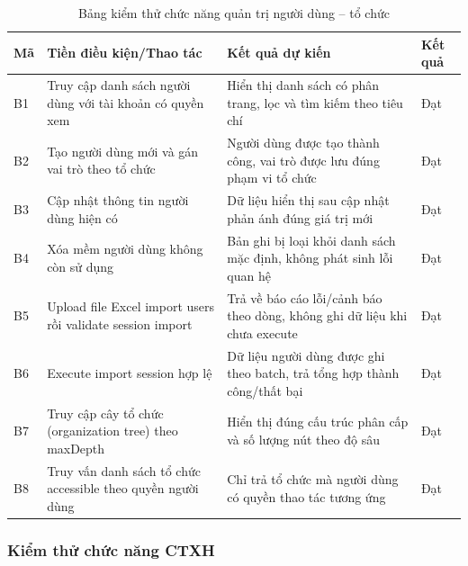 \begin{table}[H]
\centering
\renewcommand{\arraystretch}{1.2}
\small
\begin{tabular}{|p{2.0cm}|p{4.8cm}|p{4.5cm}|p{3.2cm}|}
\hline
\textbf{Mã} & \textbf{Tiền điều kiện/Thao tác} & \textbf{Kết quả dự kiến} & \textbf{Kết quả} \\
\hline
B1 & Truy cập danh sách người dùng với tài khoản có quyền xem & Hiển thị danh sách có phân trang, lọc và tìm kiếm theo tiêu chí & Đạt \\
\hline
B2 & Tạo người dùng mới và gán vai trò theo tổ chức & Người dùng được tạo thành công, vai trò được lưu đúng phạm vi tổ chức & Đạt \\
\hline
B3 & Cập nhật thông tin người dùng hiện có & Dữ liệu hiển thị sau cập nhật phản ánh đúng giá trị mới & Đạt \\
\hline
B4 & Xóa mềm người dùng không còn sử dụng & Bản ghi bị loại khỏi danh sách mặc định, không phát sinh lỗi quan hệ & Đạt \\
\hline
B5 & Upload file Excel import users rồi validate session import & Trả về báo cáo lỗi/cảnh báo theo dòng, không ghi dữ liệu khi chưa execute & Đạt \\
\hline
B6 & Execute import session hợp lệ & Dữ liệu người dùng được ghi theo batch, trả tổng hợp thành công/thất bại & Đạt \\
\hline
B7 & Truy cập cây tổ chức (organization tree) theo maxDepth & Hiển thị đúng cấu trúc phân cấp và số lượng nút theo độ sâu & Đạt \\
\hline
B8 & Truy vấn danh sách tổ chức accessible theo quyền người dùng & Chỉ trả tổ chức mà người dùng có quyền thao tác tương ứng & Đạt \\
\hline
\end{tabular}
\caption{Bảng kiểm thử chức năng quản trị người dùng -- tổ chức}
\end{table}

\subsubsection{Kiểm thử chức năng CTXH}

